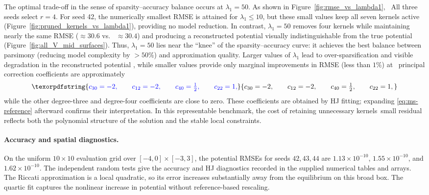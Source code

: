 \documentclass[11pt]{article}
\theoremstyle{plain}      %
\theoremstyle{definition} %
\providecommand{\DIFaddtex}[1]{{\protect\color{blue}#1}} %
\providecommand{\DIFdeltex}[1]{{\protect\color{red}#1}} %
\providecommand{\DIFaddbegin}{} %
\providecommand{\DIFaddend}{} %
\providecommand{\DIFdelbegin}{} %
\providecommand{\DIFdelend}{} %
\providecommand{\DIFadd}[1]{\texorpdfstring{\DIFaddtex{#1}}{#1}} %
\providecommand{\DIFdel}[1]{\texorpdfstring{\DIFdeltex{#1}}{}} %
\newcommand{\DIFscaledelfig}{1.0}
\newlength{\DIFdelgraphicswidth} %
\newlength{\DIFdelgraphicsheight} %
\newcommand{\DIFaddincludegraphics}[2][]{{\color{blue}\fbox{\DIFOincludegraphics[#1]{#2}}}} %
\newcommand{\DIFdelincludegraphics}[2][]{%
\sbox{\DIFdelgraphicsbox}{\DIFOincludegraphics[#1]{#2}}%
\settoboxwidth{\DIFdelgraphicswidth}{\DIFdelgraphicsbox} %
\settoboxtotalheight{\DIFdelgraphicsheight}{\DIFdelgraphicsbox} %
\scalebox{\DIFscaledelfig}{%
\parbox[b]{\DIFdelgraphicswidth}{\usebox{\DIFdelgraphicsbox}\\[-\baselineskip] \rule{\DIFdelgraphicswidth}{0em}}\llap{\resizebox{\DIFdelgraphicswidth}{\DIFdelgraphicsheight}{%
\setlength{\unitlength}{\DIFdelgraphicswidth}%
\begin{picture}(1,1)%
\thicklines\linethickness{2pt} %
{\color[rgb]{1,0,0}\put(0,0){\framebox(1,1){}}}%
{\color[rgb]{1,0,0}\put(0,0){\line( 1,1){1}}}%
{\color[rgb]{1,0,0}\put(0,1){\line(1,-1){1}}}%
\end{picture}%
}\hspace*{3pt}}} %
} %
\DeclareRobustCommand{\DIFaddbegin}{\DIFOaddbegin \let\includegraphics\DIFaddincludegraphics} %
\DeclareRobustCommand{\DIFaddend}{\DIFOaddend \let\includegraphics\DIFOincludegraphics} %
\DeclareRobustCommand{\DIFdelbegin}{\DIFOdelbegin \let\includegraphics\DIFdelincludegraphics} %
\DeclareRobustCommand{\DIFdelend}{\DIFOaddend \let\includegraphics\DIFOincludegraphics} %
\begin{document}
\DIFdelbegin \DIFdel{The optimal trade-off in the sense of sparsity--accuracy balance occurs at $\lambda_1 = 50$. As shown in Figure~\ref{fig:rmse_vs_lambda1}, }\DIFdelend\ \DIFaddbegin \DIFadd{All three seeds select $r=4$. For seed 42, }\DIFaddend the \DIFdelbegin \DIFdel{numerically smallest RMSE is attained for $\lambda_1 \leq 10$, but these small values keep all seven kernels active (Figure~\ref{fig:pruned_kernels_vs_lambda1}), providing no model reduction. In contrast, $\lambda_1 = 50$ removes four kernels while maintaining nearly the same RMSE ($\approx 30.6$ vs. \ $\approx 30.4$) and producing a reconstructed potential visually indistinguishable from the true potential (Figure~\ref{fig:all_V_mid_surfaces}).
Thus, $\lambda_1 = 50$ lies near the ``knee'' of the sparsity--accuracy curve: it achieves the best balance between parsimony (reducing model complexity by $>50\%$) and approximation quality. Larger values of $\lambda_1$ lead to over-sparsification and visible degradation in the reconstructed potential
, while smaller values provide only marginal improvements in RMSE (less than $1\%$) at }\DIFdelend\ \DIFaddbegin \DIFadd{principal correction coefficients are approximately
}\[
 \DIFadd{c_{30}=-2,\qquad c_{12}=-2,\qquad c_{40}=\tfrac12,\qquad c_{22}=1,
}\]
\DIFadd{while the other degree-three and degree-four coefficients are close to zero. These coefficients are obtained by HJ fitting; expanding \eqref{eq:ms-reference} afterward confirms their interpretation. In this representable benchmark, }\DIFaddend the \DIFdelbegin \DIFdel{cost of retaining unnecessary kernels}\DIFdelend\ \DIFaddbegin \DIFadd{small residual reflects both the polynomial structure of the solution and the stable local constraints.
}

\paragraph{\DIFadd{Accuracy and spatial diagnostics.}}
\DIFadd{On the uniform $10\times10$ evaluation grid over $[-4,0]\times[-3,3]$, the potential RMSEs for seeds $42,43,44$ are $1.13\times10^{-10}$, $1.55\times10^{-10}$, and $1.62\times10^{-10}$. The independent random tests give the accuracy and HJ diagnostics recorded in the supplied numerical tables and arrays. The Riccati approximation is a local quadratic, so its error increases substantially away from the equilibrium on this broad box. The quartic fit captures the nonlinear increase in potential without reference-based rescaling}\DIFaddend .
\end{document}
